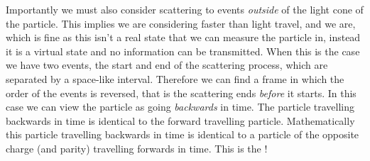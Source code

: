 \documentclass[fleqn]{NotesClass}
\begin{document}
    Importantly we must also consider scattering to events \emph{outside} of the light cone of the particle.
    This implies we are considering faster than light travel, and we are, which is fine as this isn't a real state that we can measure the particle in, instead it is a virtual state and no information can be transmitted.
    When this is the case we have two events, the start and end of the scattering process, which are separated by a space-like interval.
    Therefore we can find a frame in which the order of the events is reversed, that is the scattering ends \emph{before} it starts.
    In this case we can view the particle as going \emph{backwards} in time.
    The particle travelling backwards in time is identical to the forward travelling particle.
    Mathematically this particle travelling backwards in time is identical to a particle of the opposite charge (and parity) travelling forwards in time.
    This is the !
    
\end{document}
